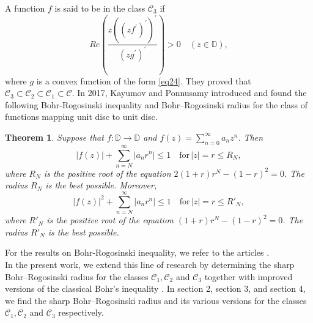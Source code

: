 \documentclass[12pt,a4paper,reqno]{amsart}
\theoremstyle{definition}
\theoremstyle{plain}
\newtheorem{theorem}[definition]{Theorem}
\numberwithin{equation}{section}
\begin{document}
A function $f$ is said to be in the class $\mathcal{C}_3$ if
\begin{equation*}
Re\left(   \frac{z((zf^{'})^{'})^{'}}{(zg^{'})^{'}}  \right)>0 \quad (z \in \mathbb{D}),
\end{equation*}
where  $g$ is a convex function of the form \eqref{eq24}. They proved that  $\mathcal{C}_3 \subset \mathcal{C}_2\subset \mathcal{C}_1 \subset \mathcal{C}$.
In 2017,
Kayumov and Ponnusamy \cite{kay2017} introduced and found the following Bohr-Rogosinski inequality and  Bohr–Rogosinski radius for the class of  functions mapping unit disc to unit disc.
\begin{theorem}\cite{kay2017}
Suppose that $f:\mathbb{D}\rightarrow\mathbb{D}$ and $f(z)=\sum_{n=0}^{\infty}a_nz^n$. Then
\begin{equation*}
|f(z)|+\sum_{n=N}^{\infty}|a_n r^n|\leq1 \quad \text{for}\, |z|=r\leq R_N,
\end{equation*}
where $R_N$ is the positive root of the equation $2(1+r)r^N-(1-r)^2=0$. The radius $R_N$ is the best possible. Moreover,
\begin{equation*}
|f(z)|^2+\sum_{n=N}^{\infty}|a_n r^n|\leq1 \quad \text{for} \,|z|=r\leq R'_N,
\end{equation*}
where $R'_N$ is the positive root of the equation $(1+r)r^N-(1-r)^2=0$. The radius $R'_N$ is the best possible.
\end{theorem}
\noindent
For the results on Bohr-Rogosinski inequality, we refer to the articles \cite{ALK2020, KAV2021, PON2022,Pon2020}.
\\
\noindent
In the present work, we extend this line of research by determining the sharp Bohr–Rogosinski radius for the classes $\mathcal{C}_1, \mathcal{C}_2$ and $\mathcal{C}_3$ together with  improved
versions of the classical Bohr’s inequality . In section 2, section 3, and section 4, we find the sharp Bohr–Rogosinski radius and its various versions for the classes $\mathcal{C}_1, \mathcal{C}_2$ and $\mathcal{C}_3$ respectively.
\end{document}
